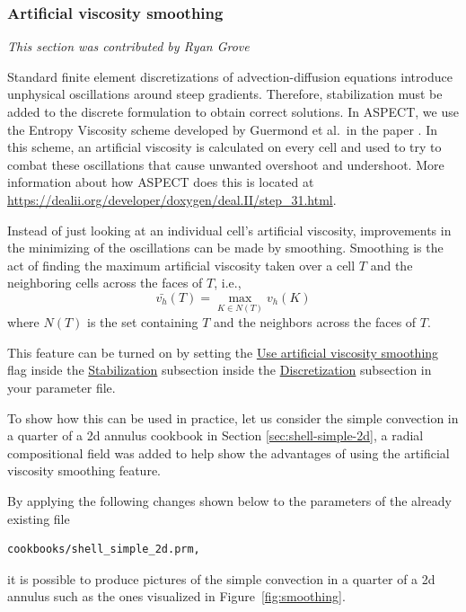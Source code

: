\documentclass{article}
\newcommand{\aspect}{\textsc{ASPECT}}
\begin{document}
\subsubsection{Artificial viscosity smoothing}
\label{sec:artificial-viscosity-smoothing}
\textit{This section was contributed by Ryan Grove}

Standard finite element discretizations of advection-diffusion equations introduce unphysical oscillations around steep gradients. Therefore, stabilization must be added to the discrete formulation to obtain correct solutions. In ASPECT, we use the Entropy Viscosity scheme developed by Guermond et al.~in the paper \cite{guer11}. In this scheme, an artificial viscosity is calculated on every cell and used to try to combat these oscillations that cause unwanted overshoot and undershoot.  More information about how \aspect{} does this is located at \url{https://dealii.org/developer/doxygen/deal.II/step_31.html}.

Instead of just looking at an individual cell's artificial viscosity, improvements in the minimizing of the oscillations can be made by smoothing.  Smoothing is the act of finding the maximum artificial viscosity taken over a cell $T$ and the neighboring cells across the faces of $T$, i.e.,
\begin{equation*}
\bar{v_h}(T) = \max_{K \in N(T)} v_h(K)
\end{equation*}
where $N(T)$ is the set containing $T$ and the neighbors across the faces of $T$.

This feature can be turned on by setting the \hyperref[parameters:Discretization/Stabilization parameters/Use artificial viscosity smoothing]{Use artificial viscosity smoothing} flag inside the \hyperref[parameters:Discretization/Stabilization_20parameters]{Stabilization} subsection inside the \hyperref[parameters:Discretization]{Discretization} subsection in your parameter file.

To show how this can be used in practice, let us consider the simple convection in a quarter of a 2d annulus cookbook in Section \ref{sec:shell-simple-2d}, a radial compositional field was added to help show the advantages of using the artificial viscosity smoothing feature.

By applying the following changes shown below to the parameters of the already existing file \begin{verbatim}cookbooks/shell_simple_2d.prm, \end{verbatim}

it is possible to produce pictures of the simple convection in a quarter of a 2d annulus such as the ones visualized in
Figure~\ref{fig:smoothing}.
\end{document}

